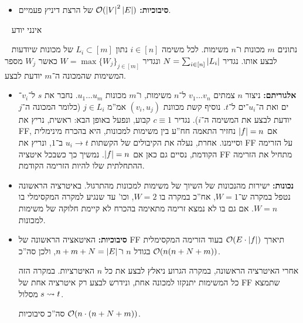 \documentclass[]{article}
\newcommand\str {^{\star}}
\begin{document}
\begin{enumerate}[(A)]
\begin{itemize}
\begin{itemize}
				\item[$\impliedby$] אם $\sof f + 1 = \sof{f'}$ למרות ש(בשלילה) ישנו חתך $(S, T)$ בגרף המקורי שלא כולל את $e\str$. אז זהו גם חתך בגרף השני מאותו הקיבול (שכן $e\str$ לא עליו) וזו סתירה למינימליות של $\sof{f'}$ (כי מצאנו חתך מקיבול $\sof f$ במקום $\sof f + 1$). 
			\end{itemize}
			סה''כ בשני הכיוונים הוכחנו נכונות. 
			\item \textbf{סיבוכיות: }$\mathcal{O}(\left \lvert V \right \rvert^2 \left \lvert E \right \rvert)$ של הרצת דיניץ פעמיים. 
		\end{itemize}
	\end{enumerate}
	
	\newpage \ \newpage 
	אינני יודע
	
	\newpage \ \newpage 
	נתונים $m$ מכונות ו־$n$ משימות. לכל משימה $i \in [n]$ נתון $L_i \subset [m]$ של מכונות שיודעות לבצע אותו. נגדיר $N = \sum_{i \in [n]} \left \lvert L_i \right \rvert$ ונגדיר $W = \max\{W_j\}_{j \in [m]}$ כאשר $W_j$ מספר המשימות שהמכונה ה־$m$ יודעת לבצע. 
	\begin{itemize}
		\item \textbf{אלגוריתם: }ניצור $n$ צמתים $v_1 \dots v_n$ ל־$n$ משימות, ו־$m$ מכונות $u_1 \dots u_m$. נחבר את $s$ ל־$v_i$־ים ואת ה־$u_i$־ים ל־$t$. נוסיף קשת מכוונת $(v_i, u_j)$ אמ''מ $j \in L_i$ (כלומר המכונה ה־$j$ יודעת לבצע את המשימה ה־$i$). נגדיר $c \equiv 1$ קבוע, ונפעל באופן הבא: ראשית, נריץ את FF, אם $\left \lvert f \right \rvert = n$ נחזיר התאמה חח''ע בין משימות למכונות, היא בהכרח מינימלית וסיימנו. אחרת, נעלה את הקיבולים של הקשתות $u_i \to t$ ב־$1$, ונריץ את FF על הזרימה הקודמת, נסיים גם כאן אם $\left \lvert f \right \rvert = n$. נמשיך כך כשבכל איטציה FF מתחיל את הזרימה ההתחלתית שלו להיות הזרימה הקודמת. 
		\item \textbf{נכונות: }ישירות מהנכונות של השיוך של משימות למכונות מהתרגול. באיטרציה הראשונה נטפל במקרה ש־$W = 1$, אח''כ במקרה בו $W = 2$, וכו' עד שנגיע למקרה המקסימלי בו $W = n$. אם גם בו לא נמצא זרימה מתאימה בהכרח לא קיימת חלוקה של משימות למכונות. 
		\item \textbf{סיבוכיות: }האיטאציה הראשונה של FF תיארך $\mathcal{O}(E \cdot {\left \lvert f \right \rvert})$ בעוד הזרימה המקסימלית בגודל $n$ ו־$n + m + N = \left \lvert E \right \rvert$, ולכן סה''כ $\mathcal{O}(n(n + N + m))$. 
		
		אחרי האיטרציה הראשונה, במקרה הגרוע ניאלץ לבצע את כל $n$ האיטרציות. במקרה הזה כל המשימות יתנקזו למכונה אחת, ונידרש לבצע רק איטרציה אחת של FF שתמצא מסלול $s \rightsquigarrow t$. 
		
		סה''כ סיבוכיות $\mathcal{O}(n \cdot (n + N + m))$. 
	\end{itemize}
	
\end{document}
